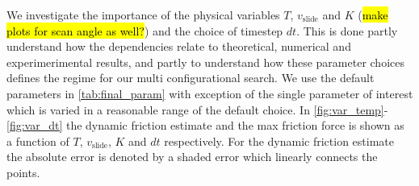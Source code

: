 We investigate the importance of the physical variables $T$, $v_{\text{slide}}$ and $K$ (\hl{make plots for scan angle as well?}) and the choice of timestep $dt$. This is done partly understand how the dependencies relate to theoretical, numerical and experimerimental results, and partly to understand how these parameter choices defines the regime for our multi configurational search. We use the default parameters in \cref{tab:final_param} with exception of the single parameter of interest which is varied in a reasonable range of the default choice. In \cref{fig:var_temp}-\cref{fig:var_dt} the dynamic friction estimate and the max friction force is shown as a function of $T$, $v_{\text{slide}}$, $K$ and $dt$ respectively. For the dynamic friction estimate the absolute error is denoted by a shaded error which linearly connects the points.


